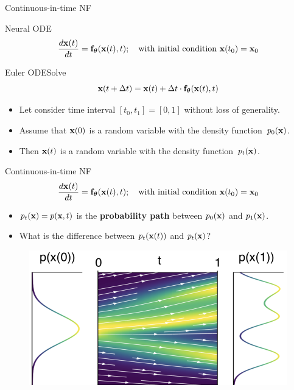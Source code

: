 \begin{frame}{Continuous-in-time NF}
	\begin{block}{Neural ODE}
		\vspace{-0.2cm}
		\[
  			\frac{d \mathbf{x}(t)}{dt} = \mathbf{f}_{\boldsymbol{\theta}}(\mathbf{x}(t), t); \quad \text{with initial condition }\mathbf{x}(t_0) = \mathbf{x}_0
		\]
		\vspace{-0.3cm}
	\end{block}
	\begin{block}{Euler ODESolve}
		\vspace{-0.3cm}
		\[
		    \mathbf{x}(t + \Delta t) = \mathbf{x}(t) + \Delta t \cdot \mathbf{f}_{\boldsymbol{\theta}}(\mathbf{x}(t), t)
		\]
		\vspace{-0.5cm}
	\end{block}
	\begin{itemize}
		\item Let consider time interval $[t_0, t_1] = [0, 1]$ without loss of generality.
		\item Assume that $\mathbf{x}(0)$ is a random variable with the density function~$p_0(\mathbf{x})$.
		\item Then $\mathbf{x}(t)$ is a random variable with the density function~$p_t(\mathbf{x})$.
	\end{itemize}

\end{frame}
\begin{frame}{Continuous-in-time NF}
	\[
 		\frac{d \mathbf{x}(t)}{dt} = \mathbf{f}_{\boldsymbol{\theta}}(\mathbf{x}(t), t); \quad \text{with initial condition }\mathbf{x}(t_0) = \mathbf{x}_0
	\]
	\vspace{-0.5cm}
	\begin{itemize}
		\item$p_t(\mathbf{x}) = p(\mathbf{x}, t)$ is the \textbf{probability path} between $p_0(\mathbf{x})$ and $p_1(\mathbf{x})$.
		\item {\color{gray}What is the difference between $p_t(\mathbf{x}(t))$ and $p_t(\mathbf{x})$?}
	\end{itemize}
	\begin{figure}
		\centering
		\includegraphics[width=0.75\linewidth]{figs/cnf_flow.png}
	\end{figure}
\end{frame}
